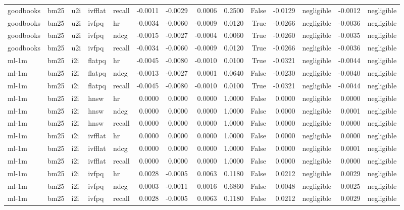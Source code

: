 \begin{tabular}{lllllrrrrrrlrl}
goodbooks & bm25 & u2i & ivfflat & recall & -0.0011 & -0.0029 & 0.0006 & 0.2500 & False & -0.0129 & negligible & -0.0012 & negligible \\
goodbooks & bm25 & u2i & ivfpq & hr & -0.0034 & -0.0060 & -0.0009 & 0.0120 & True & -0.0266 & negligible & -0.0036 & negligible \\
goodbooks & bm25 & u2i & ivfpq & ndcg & -0.0015 & -0.0027 & -0.0004 & 0.0060 & True & -0.0260 & negligible & -0.0035 & negligible \\
goodbooks & bm25 & u2i & ivfpq & recall & -0.0034 & -0.0060 & -0.0009 & 0.0120 & True & -0.0266 & negligible & -0.0036 & negligible \\
ml-1m & bm25 & i2i & flatpq & hr & -0.0045 & -0.0080 & -0.0010 & 0.0100 & True & -0.0321 & negligible & -0.0044 & negligible \\
ml-1m & bm25 & i2i & flatpq & ndcg & -0.0013 & -0.0027 & 0.0001 & 0.0640 & False & -0.0230 & negligible & -0.0040 & negligible \\
ml-1m & bm25 & i2i & flatpq & recall & -0.0045 & -0.0080 & -0.0010 & 0.0100 & True & -0.0321 & negligible & -0.0044 & negligible \\
ml-1m & bm25 & i2i & hnsw & hr & 0.0000 & 0.0000 & 0.0000 & 1.0000 & False & 0.0000 & negligible & 0.0000 & negligible \\
ml-1m & bm25 & i2i & hnsw & ndcg & 0.0000 & 0.0000 & 0.0000 & 1.0000 & False & 0.0000 & negligible & 0.0001 & negligible \\
ml-1m & bm25 & i2i & hnsw & recall & 0.0000 & 0.0000 & 0.0000 & 1.0000 & False & 0.0000 & negligible & 0.0000 & negligible \\
ml-1m & bm25 & i2i & ivfflat & hr & 0.0000 & 0.0000 & 0.0000 & 1.0000 & False & 0.0000 & negligible & 0.0000 & negligible \\
ml-1m & bm25 & i2i & ivfflat & ndcg & 0.0000 & 0.0000 & 0.0000 & 1.0000 & False & 0.0000 & negligible & 0.0001 & negligible \\
ml-1m & bm25 & i2i & ivfflat & recall & 0.0000 & 0.0000 & 0.0000 & 1.0000 & False & 0.0000 & negligible & 0.0000 & negligible \\
ml-1m & bm25 & i2i & ivfpq & hr & 0.0028 & -0.0005 & 0.0063 & 0.1180 & False & 0.0212 & negligible & 0.0029 & negligible \\
ml-1m & bm25 & i2i & ivfpq & ndcg & 0.0003 & -0.0011 & 0.0016 & 0.6860 & False & 0.0048 & negligible & 0.0025 & negligible \\
ml-1m & bm25 & i2i & ivfpq & recall & 0.0028 & -0.0005 & 0.0063 & 0.1180 & False & 0.0212 & negligible & 0.0029 & negligible \\

\end{tabular}
